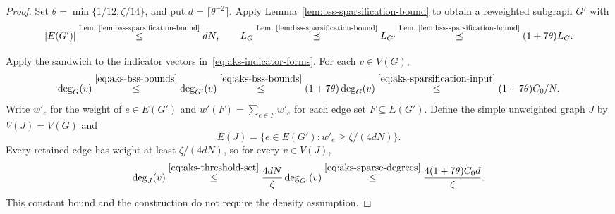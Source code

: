 \begin{proof}
Set $\theta=\min\{1/12,\zeta/14\}$,
and put $d=\lceil\theta^{-2}\rceil$.
Apply Lemma~\ref{lem:bss-sparsification-bound} to obtain a reweighted subgraph
$G'$ with
\begin{equation}\label{eq:aks-bss-bounds}
|E(G')|\overset{\text{Lem.~\ref{lem:bss-sparsification-bound}}}{\leq}dN,
 \qquad L_G\overset{\text{Lem.~\ref{lem:bss-sparsification-bound}}}{\preceq}L_{G'}
 \overset{\text{Lem.~\ref{lem:bss-sparsification-bound}}}{\preceq}(1+7\theta)L_G.
\end{equation}

Apply the sandwich to the indicator vectors
in~\eqref{eq:aks-indicator-forms}. For each $v\in V(G)$,
\begin{equation}\label{eq:aks-sparse-degrees}
\deg_G(v)\overset{\eqref{eq:aks-bss-bounds}}{\leq}\deg_{G'}(v)
  \overset{\eqref{eq:aks-bss-bounds}}{\leq}(1+7\theta)\deg_G(v)
 \overset{\eqref{eq:aks-sparsification-input}}{\leq}(1+7\theta)C_0/N.
\end{equation}
Write $w'_e$ for the weight of $e\in E(G')$ and
$w'(F)=\sum_{e\in F}w'_e$ for each edge set $F\subseteq E(G')$. Define
the simple unweighted graph $J$ by $V(J)=V(G)$ and
\begin{equation}\label{eq:aks-threshold-set}
 E(J)=\{e\in E(G'):w'_e\ge\zeta/(4dN)\}.
\end{equation}
Every retained edge has weight at least $\zeta/(4dN)$, so
for every $v\in V(J)$,
\begin{equation}\label{eq:aks-final-degree}
 \deg_J(v)\overset{\eqref{eq:aks-threshold-set}}{\leq}
 \frac{4dN}{\zeta}\deg_{G'}(v)
 \overset{\eqref{eq:aks-sparse-degrees}}{\leq}
 \frac{4(1+7\theta)C_0d}{\zeta}.
\end{equation}
This constant bound and the construction do not require the density
assumption.


\end{proof}
